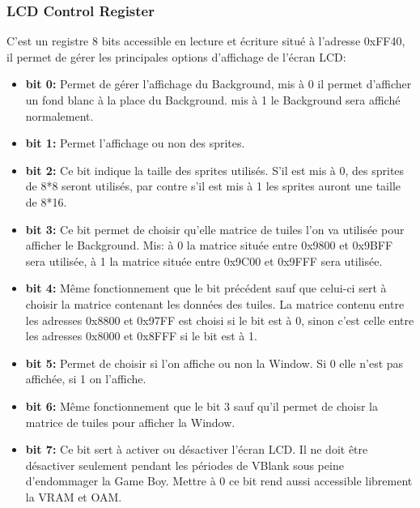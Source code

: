 \documentclass{report}
\begin{document}
\subsubsection{LCD Control Register}
C'est un registre 8 bits accessible en lecture et écriture situé à l'adresse 0xFF40, il permet de gérer les principales options d'affichage de l'écran LCD:\\

\begin{itemize}
\item \textbf{bit 0:}
	Permet de gérer l'affichage du Background, mis à 0 il permet d'afficher un fond blanc à la place du Background. mis à 1 le Background sera affiché normalement.\\
\item \textbf{bit 1:}
	Permet l'affichage ou non des sprites.\\
\item \textbf{bit 2:}
	Ce bit indique la taille des sprites utilisés. S'il est mis à 0, des sprites de 8*8 seront utilisés, par contre s'il est mis à 1 les sprites auront une taille de 8*16.\\
\item \textbf{bit 3:}
	Ce bit permet de choisir qu'elle matrice de tuiles l'on va utilisée pour afficher le Background. Mis: à 0 la matrice située entre 0x9800 et 0x9BFF sera utilisée, à 1 la matrice située entre 0x9C00 et 0x9FFF sera utilisée.\\
\item \textbf{bit 4:}
	Même fonctionnement que le bit précédent sauf que celui-ci sert à choisir la matrice contenant les données des tuiles. La matrice contenu entre les adresses 0x8800 et 0x97FF est choisi si le bit est à 0, sinon c'est celle entre les adresses 0x8000 et 0x8FFF si le bit est à 1.\\
\item \textbf{bit 5:}
	Permet de choisir si l'on affiche ou non la Window. Si 0 elle n'est pas affichée, si 1 on l'affiche.\\
\item \textbf{bit 6:}
	Même fonctionnement que le bit 3 sauf qu'il permet de choisr la matrice de tuiles pour afficher la Window.\\
\item \textbf{bit 7:}
	Ce bit sert à activer ou désactiver l'écran LCD. Il ne doit être désactiver seulement pendant les périodes de VBlank sous peine d'endommager la Game Boy. Mettre à 0 ce bit rend aussi accessible librement la VRAM et OAM.\\
\end{itemize}
\end{document}
